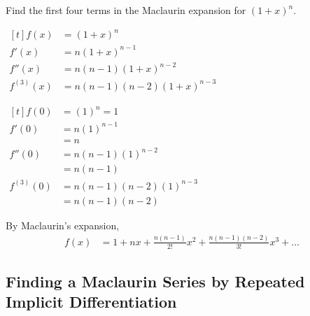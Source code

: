 \documentclass[11pt,a4paper]{book}
\begin{document}
\begin{example}

Find the first four terms in the Maclaurin expansion for $\left(1+x\right)^{n}$.

\Solution

\begin{minipage}[t]{0.4\textwidth}

$
\begin{aligned}[t]
f\left(x\right) & =\left(1+x\right)^{n}\\
f'\left(x\right) & =n\left(1+x\right)^{n-1}\\
f''\left(x\right) & =n\left(n-1\right)\left(1+x\right)^{n-2}\\
f^{\left(3\right)}\left(x\right) & =n\left(n-1\right)\left(n-2\right)\left(1+x\right)^{n-3}
\end{aligned}
$

\end{minipage}
\vline\hfill
\begin{minipage}[t]{0.5\textwidth}

$
\begin{aligned}[t]
f\left(0\right) & =\left(1\right)^{n}=1\\
f'\left(0\right) & =n\left(1\right)^{n-1}\\
 & =n\\
f''\left(0\right) & =n\left(n-1\right)\left(1\right)^{n-2}\\
 & =n\left(n-1\right)\\
f^{\left(3\right)}\left(0\right) & =n\left(n-1\right)\left(n-2\right)\left(1\right)^{n-3}\\
 & =n\left(n-1\right)\left(n-2\right)
\end{aligned}
$

\end{minipage}

By Maclaurin's expansion,
\begin{align*}
f\left(x\right) & =1+nx+\frac{n\left(n-1\right)}{2!}x^{2}+\frac{n\left(n-1\right)\left(n-2\right)}{3!}x^{3}+...
\end{align*}

\end{example}

\newpage

\subsection{Finding a Maclaurin Series by Repeated Implicit Differentiation}
\end{document}
